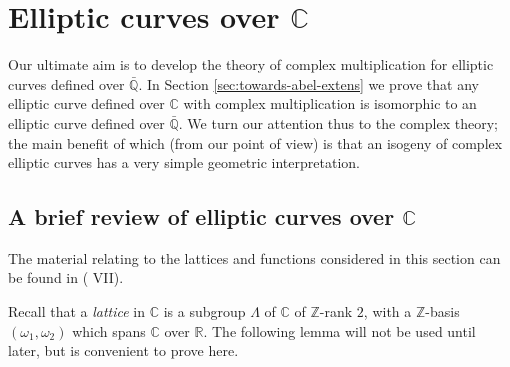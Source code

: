 \newpage
\section{Elliptic curves over $\mathbb{C}$}
\label{sec:compl-mult-over-C}

Our ultimate aim is to develop the theory of complex multiplication for elliptic
curves defined over $\mathbb{\bar{Q}}$.  In Section \ref{sec:towards-abel-extens} we
prove that any elliptic curve defined over $\mathbb{C}$ with complex
multiplication is isomorphic to an elliptic curve defined over $\mathbb{\bar{Q}}$.
We turn our attention thus to the complex theory; the main benefit of which (from our
point of view) is that an isogeny of complex elliptic curves has a very simple
geometric interpretation.

\subsection{A brief review of elliptic curves over $\mathbb{C}$}
\label{sec:review-complex-curves}

The material relating to the lattices and functions considered in this section can be
found in (\cite{serre73} VII).

Recall that a \emph{lattice} in $\mathbb{C}$ is a subgroup $\Lambda$ of $\mathbb{C}$
of $\mathbb{Z}$-rank $2$, with a $\mathbb{Z}$-basis $(\omega_{1},\omega_{2})$ which
spans $\mathbb{C}$ over $\mathbb{R}$.  The following lemma will not be used until
later, but is convenient to prove here.


